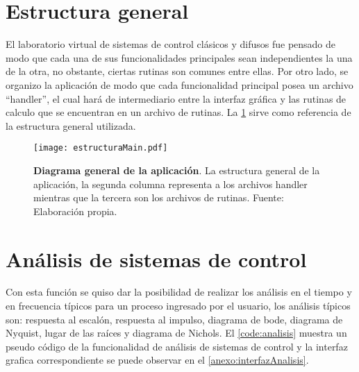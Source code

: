\section{Estructura general}

    El laboratorio virtual de sistemas de control clásicos y difusos fue pensado de modo que cada una de sus funcionalidades principales sean independientes la una de la otra, no obstante, ciertas rutinas son comunes entre ellas. Por otro lado, se organizo la aplicación de modo que cada funcionalidad principal posea un archivo \enquote{handler}, el cual hará de intermediario entre la interfaz gráfica y las rutinas de calculo que se encuentran en un archivo de rutinas. La \cref{fig:estructuraMain} sirve como referencia de la estructura general utilizada.

    \begin{figure}[htb]
        \centering
        \texttt{[image: estructuraMain.pdf]}
        \caption[Diagrama general de la aplicación]{\textbf{Diagrama general de la aplicación}. La estructura general de la aplicación, la segunda columna representa a los archivos handler mientras que la tercera son los archivos de rutinas. Fuente: Elaboración propia.} 
        \label{fig:estructuraMain}
    \end{figure}

\section{Análisis de sistemas de control}
    
    Con esta función se quiso dar la posibilidad de realizar los análisis en el tiempo y en frecuencia típicos para un proceso ingresado por el usuario, los análisis típicos son: respuesta al escalón, respuesta al impulso, diagrama de bode, diagrama de Nyquist, lugar de las raíces y diagrama de Nichols. El \cref{code:analisis} muestra un pseudo código de la funcionalidad de análisis de sistemas de control y la interfaz grafica correspondiente se puede observar en el \ref{anexo:interfazAnalisis}.

